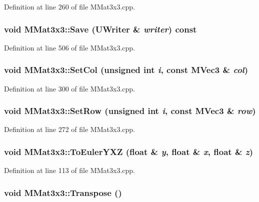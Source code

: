 Definition at line 260 of file MMat3x3.cpp.\hypertarget{class_m_mat3x3_fda8bdfde06537ba03acee59fbffc41a}{
\subsubsection[{Save}]{\setlength{\rightskip}{0pt plus 5cm}void MMat3x3::Save ({\bf UWriter} \& {\em writer}) const}}
\label{class_m_mat3x3_fda8bdfde06537ba03acee59fbffc41a}




Definition at line 506 of file MMat3x3.cpp.\hypertarget{class_m_mat3x3_7f30bf03e58ead2cd8d781234be60868}{
\subsubsection[{SetCol}]{\setlength{\rightskip}{0pt plus 5cm}void MMat3x3::SetCol (unsigned int {\em i}, \/  const {\bf MVec3} \& {\em col})}}
\label{class_m_mat3x3_7f30bf03e58ead2cd8d781234be60868}




Definition at line 300 of file MMat3x3.cpp.\hypertarget{class_m_mat3x3_1cd3b344fa0732e7be859ce95f35f063}{
\subsubsection[{SetRow}]{\setlength{\rightskip}{0pt plus 5cm}void MMat3x3::SetRow (unsigned int {\em i}, \/  const {\bf MVec3} \& {\em row})}}
\label{class_m_mat3x3_1cd3b344fa0732e7be859ce95f35f063}




Definition at line 272 of file MMat3x3.cpp.\hypertarget{class_m_mat3x3_10714e78ed687e30e915ef75c34c5cbb}{
\subsubsection[{ToEulerYXZ}]{\setlength{\rightskip}{0pt plus 5cm}void MMat3x3::ToEulerYXZ (float \& {\em y}, \/  float \& {\em x}, \/  float \& {\em z})}}
\label{class_m_mat3x3_10714e78ed687e30e915ef75c34c5cbb}




Definition at line 113 of file MMat3x3.cpp.\hypertarget{class_m_mat3x3_d7c9471fbcf788b8140a336ad7139a21}{
\subsubsection[{Transpose}]{\setlength{\rightskip}{0pt plus 5cm}void MMat3x3::Transpose ()}}
\label{class_m_mat3x3_d7c9471fbcf788b8140a336ad7139a21}




